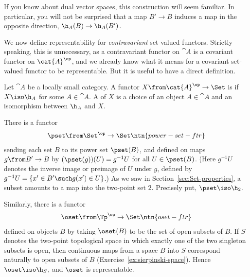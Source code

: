 If you know about dual vector spaces, this construction will seem familiar.
In particular, you will not be surprised that a map $B' \to B$ induces a
map in the opposite direction, $\h_A(B) \to \h_A(B')$.

We now define representability for \emph{contravariant} set-valued
functors.  Stri\-ctly speaking, this is unnecessary, as a contravariant
functor on $\cat{A}$ is a covariant functor on $\cat{A}^\op$, and we
already know what it means for a covariant set-valued functor to be
representable.  But it is useful to have a direct definition.

\begin{defn}
Let $\cat{A}$ be a locally small category.  A functor $X\from \cat{A}^\op \to
\Set$ is %
%
%
if $X \iso \h_A$ for some $A \in \cat{A}$.  A %
%
%
of $X$ is a choice of an object $A \in \cat{A}$ and an isomorphism between
$\h_A$ and $X$.
\end{defn}

\begin{example}        
There is a functor
\[
\pset\from \Set^\op \to \Set%
%
\ntn{power-set-ftr}
%
\]
sending each set $B$ to its power%
%
%
set $\pset(B)$, and defined on maps $g\from B' \to B$ by $(\pset(g))(U) =
g^{-1}U$ for all $U \in \pset(B)$.  (Here $g^{-1}U$ denotes the inverse%
%
%
image or preimage of $U$ under $g$, defined by $g^{-1} U = \{ x' \in B'
\such g(x') \in U \}$.)  As we saw in Section~\ref{sec:Set-properties}, a
subset amounts to a map into the two-point%
%
%
set $2$.  Precisely put, $\pset \iso \h_2$.
\end{example}

\begin{example}
\label{eg:contra-rep-sier}
Similarly, there is a functor
\[
\oset\from\Tp^\op \to \Set%
%
\ntn{oset-ftr}
%
\index{topological space!open subset of}%
\index{open subset}%
\index{set!open}
%
\]
defined on objects $B$ by taking $\oset(B)$ to be the set of open subsets
of $B$.  If $S$ denotes the two-point%
%
%
topological space in which exactly one of the two singleton subsets is
open, then continuous maps from a space $B$ into $S$ correspond naturally
to open subsets of $B$ (Exercise~\ref{ex:sierpinski-space}).  Hence $\oset
\iso \h_S$, and $\oset$ is representable.
\end{example}

